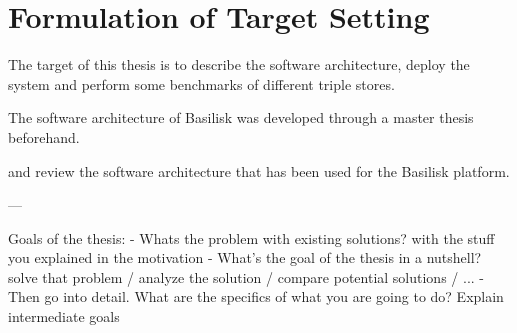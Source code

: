 \chapter{Formulation of Target Setting}
\label{ch:target_setting}

The target of this thesis is to describe the software architecture, deploy the system and perform some benchmarks of different triple stores.



The software architecture of Basilisk was developed through a master thesis beforehand. 

 and review the software architecture that has been used for the Basilisk platform.



---

Goals of the thesis:
- Whats the problem with existing solutions? with the stuff you explained in the motivation
- What's the goal of the thesis in a nutshell? solve that problem / analyze the solution / compare potential solutions / ...
- Then go into detail. What are the specifics of what you are going to do? Explain intermediate goals
